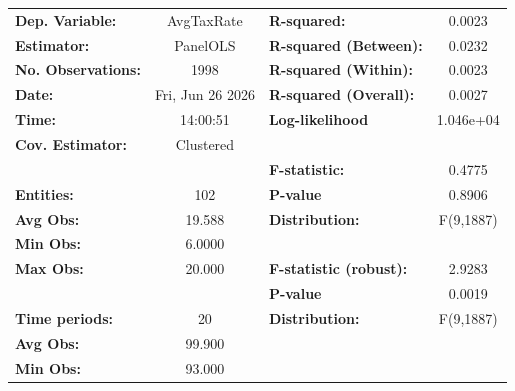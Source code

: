 \begin{center}
\begin{tabular}{lclc}
\toprule
\textbf{Dep. Variable:}                            &     AvgTaxRate     & \textbf{  R-squared:         }   &      0.0023      \\
\textbf{Estimator:}                                &      PanelOLS      & \textbf{  R-squared (Between):}  &      0.0232      \\
\textbf{No. Observations:}                         &        1998        & \textbf{  R-squared (Within):}   &      0.0023      \\
\textbf{Date:}                                     &  Fri, Jun 26 2026  & \textbf{  R-squared (Overall):}  &      0.0027      \\
\textbf{Time:}                                     &      14:00:51      & \textbf{  Log-likelihood     }   &    1.046e+04     \\
\textbf{Cov. Estimator:}                           &     Clustered      & \textbf{                     }   &                  \\
\textbf{}                                          &                    & \textbf{  F-statistic:       }   &      0.4775      \\
\textbf{Entities:}                                 &        102         & \textbf{  P-value            }   &      0.8906      \\
\textbf{Avg Obs:}                                  &       19.588       & \textbf{  Distribution:      }   &    F(9,1887)     \\
\textbf{Min Obs:}                                  &       6.0000       & \textbf{                     }   &                  \\
\textbf{Max Obs:}                                  &       20.000       & \textbf{  F-statistic (robust):} &      2.9283      \\
\textbf{}                                          &                    & \textbf{  P-value            }   &      0.0019      \\
\textbf{Time periods:}                             &         20         & \textbf{  Distribution:      }   &    F(9,1887)     \\
\textbf{Avg Obs:}                                  &       99.900       & \textbf{                     }   &                  \\
\textbf{Min Obs:}                                  &       93.000       & \textbf{                     }   &                  \\

\end{tabular}
\end{center}
